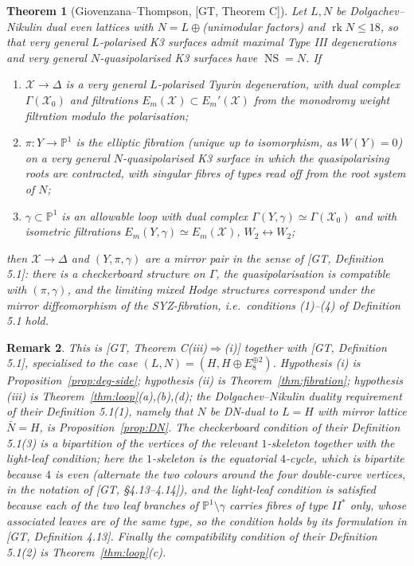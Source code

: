 \documentclass[11pt]{article}
\newtheorem{theorem}{Theorem}[section]
\newtheorem{remark}[theorem]{Remark}
\newcommand{\X}{\mathcal{X}}
\newcommand{\D}{\Delta}
\newcommand{\PP}{\mathbb{P}}
\DeclareMathOperator{\rk}{rk}
\DeclareMathOperator{\NS}{NS}
\begin{document}
\begin{theorem}[{Giovenzana--Thompson, [GT, Theorem C]}]\label{thm:GT}
Let $L,N$ be Dolgachev--Nikulin dual even lattices with
$N=L\oplus{}$(unimodular factors) and
$\rk N\le 18$, so that very general $L$-polarised K3 surfaces admit maximal
Type III degenerations and very general $N$-quasipolarised K3 surfaces have
$\NS=N$. If
\begin{enumerate}[label=(\roman*),leftmargin=2.2em]
\item $\X\to\D$ is a very general $L$-polarised Tyurin degeneration, with
dual complex $\Gamma(\X_0)$ and filtrations $E_m(\X)\subset E_m'(\X)$ from
the monodromy weight filtration modulo the polarisation;
\item $\pi\colon Y\to\PP^1$ is the elliptic fibration (unique up to
isomorphism, as $W(Y)=0$) on a very general $N$-quasipolarised K3 surface
in which the quasipolarising roots are contracted, with singular fibres of
types read off from the root system of $N$;
\item $\gamma\subset\PP^1$ is an allowable loop with dual complex
$\Gamma(Y,\gamma)\simeq\Gamma(\X_0)$ and with isometric filtrations
$E_m(Y,\gamma)\simeq E_m(\X)$, $W_2\leftrightarrow W_2$;
\end{enumerate}
then $\X\to\D$ and $(Y,\pi,\gamma)$ are a mirror pair in the sense of
[GT, Definition 5.1]: there is a checkerboard structure on $\Gamma$, the
quasipolarisation is compatible with $(\pi,\gamma)$, and the limiting mixed
Hodge structures correspond under the mirror diffeomorphism of the
SYZ-fibration, i.e.\ conditions (1)--(4) of Definition 5.1 hold.
\end{theorem}

\begin{remark}
This is [GT, Theorem C(iii)$\Rightarrow$(i)] together with [GT,
Definition 5.1], specialised to the case $(L,N)=(H,H\oplus E_8^{\oplus2})$.
Hypothesis (i) is Proposition~\ref{prop:deg-side}; hypothesis (ii) is
Theorem~\ref{thm:fibration}; hypothesis (iii) is
Theorem~\ref{thm:loop}(a),(b),(d); the Dolgachev--Nikulin duality
requirement of their Definition 5.1(1), namely that $N$ be
DN-dual to $L=H$ with mirror lattice $\bar N=H$, is
Proposition~\ref{prop:DN}. The checkerboard condition of their
Definition 5.1(3) is a bipartition of the vertices of the relevant
$1$-skeleton together with the light-leaf condition; here the
$1$-skeleton is the equatorial $4$-cycle, which is bipartite because $4$
is even (alternate the two colours around the four double-curve
vertices, in the notation of [GT, \S4.13--4.14]), and the light-leaf
condition is satisfied because each of the two leaf branches of
$\PP^1\setminus\gamma$ carries fibres of type $II^*$ only, whose
associated leaves are of the same type, so the condition holds by
its formulation in [GT, Definition 4.13]. Finally the compatibility
condition of their Definition 5.1(2) is Theorem~\ref{thm:loop}(c).
\end{remark}
\end{document}
